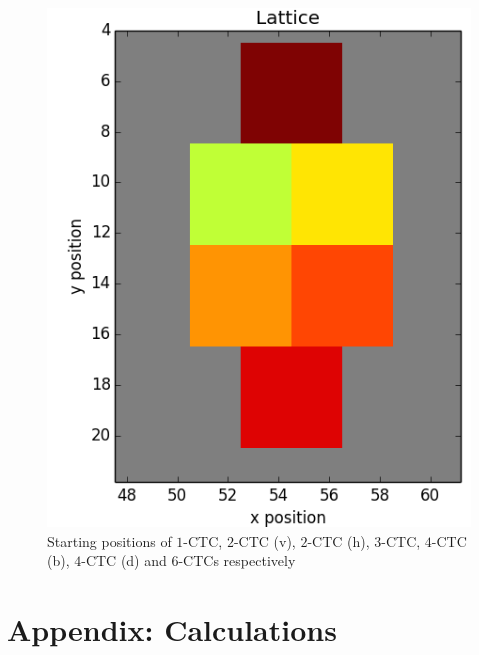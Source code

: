 \documentclass[12pt]{article}
\begin{document}
\begin{figure}[h]
	\includegraphics[scale=0.20]{img/6ctc-start}
	\caption{Starting positions of $1$-CTC, $2$-CTC (v), $2$-CTC (h), $3$-CTC, $4$-CTC (b), $4$-CTC (d) and $6$-CTCs respectively}
	\label{race_start}
\end{figure}

\newpage




\section{Appendix: Calculations}
\end{document}

